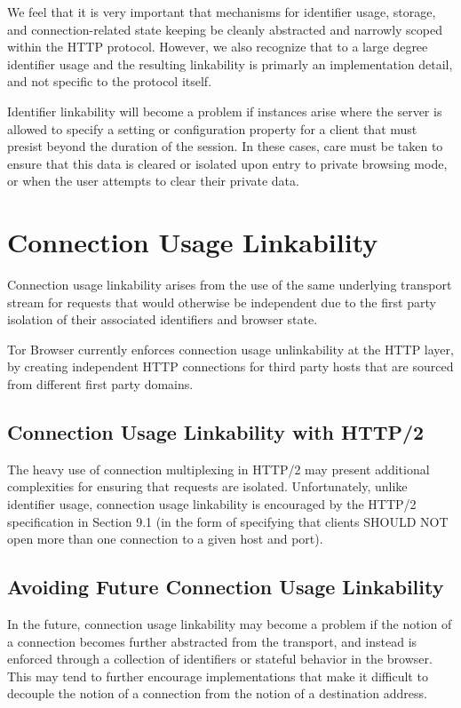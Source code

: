 \documentclass[letterpaper,11pt]{llncs}
\begin{document}
We feel that it is very important that mechanisms for identifier usage,
storage, and connection-related state keeping be cleanly abstracted and
narrowly scoped within the HTTP protocol. However, we also recognize that to a
large degree identifier usage and the resulting linkability is primarly an
implementation detail, and not specific to the protocol itself.

Identifier linkability will become a problem if instances arise where the
server is allowed to specify a setting or configuration property for a client
that must presist beyond the duration of the session. In these cases, care
must be taken to ensure that this data is cleared or isolated upon entry to
private browsing mode, or when the user attempts to clear their private data.


\section{Connection Usage Linkability}

Connection usage linkability arises from the use of the same underlying
transport stream for requests that would otherwise be independent due to the
first party isolation of their associated identifiers and browser state.

Tor Browser currently enforces connection usage unlinkability at the HTTP
layer, by creating independent HTTP connections for third party hosts that
are sourced from different first party domains.

\subsection{Connection Usage Linkability with HTTP/2}

The heavy use of connection multiplexing in HTTP/2 may present additional
complexities for ensuring that requests are isolated. Unfortunately, unlike
identifier usage, connection usage linkability is encouraged by the
HTTP/2 specification in Section 9.1 (in the form of specifying that clients
SHOULD NOT open more than one connection to a given host and port).

\subsection{Avoiding Future Connection Usage Linkability}

In the future, connection usage linkability may become a problem if the notion
of a connection becomes further abstracted from the transport, and instead is
enforced through a collection of identifiers or stateful behavior in the
browser. This may tend to further encourage implementations that make it
difficult to decouple the notion of a connection from the notion of a
destination address.
\end{document}
